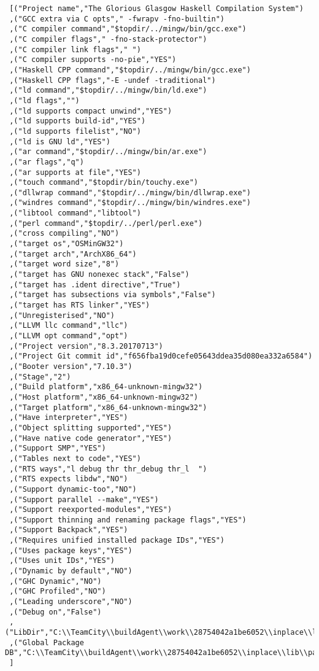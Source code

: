 \begin{verbatim}
 [("Project name","The Glorious Glasgow Haskell Compilation System")
 ,("GCC extra via C opts"," -fwrapv -fno-builtin")
 ,("C compiler command","$topdir/../mingw/bin/gcc.exe")
 ,("C compiler flags"," -fno-stack-protector")
 ,("C compiler link flags"," ")
 ,("C compiler supports -no-pie","YES")
 ,("Haskell CPP command","$topdir/../mingw/bin/gcc.exe")
 ,("Haskell CPP flags","-E -undef -traditional")
 ,("ld command","$topdir/../mingw/bin/ld.exe")
 ,("ld flags","")
 ,("ld supports compact unwind","YES")
 ,("ld supports build-id","YES")
 ,("ld supports filelist","NO")
 ,("ld is GNU ld","YES")
 ,("ar command","$topdir/../mingw/bin/ar.exe")
 ,("ar flags","q")
 ,("ar supports at file","YES")
 ,("touch command","$topdir/bin/touchy.exe")
 ,("dllwrap command","$topdir/../mingw/bin/dllwrap.exe")
 ,("windres command","$topdir/../mingw/bin/windres.exe")
 ,("libtool command","libtool")
 ,("perl command","$topdir/../perl/perl.exe")
 ,("cross compiling","NO")
 ,("target os","OSMinGW32")
 ,("target arch","ArchX86_64")
 ,("target word size","8")
 ,("target has GNU nonexec stack","False")
 ,("target has .ident directive","True")
 ,("target has subsections via symbols","False")
 ,("target has RTS linker","YES")
 ,("Unregisterised","NO")
 ,("LLVM llc command","llc")
 ,("LLVM opt command","opt")
 ,("Project version","8.3.20170713")
 ,("Project Git commit id","f656fba19d0cefe05643ddea35d080ea332a6584")
 ,("Booter version","7.10.3")
 ,("Stage","2")
 ,("Build platform","x86_64-unknown-mingw32")
 ,("Host platform","x86_64-unknown-mingw32")
 ,("Target platform","x86_64-unknown-mingw32")
 ,("Have interpreter","YES")
 ,("Object splitting supported","YES")
 ,("Have native code generator","YES")
 ,("Support SMP","YES")
 ,("Tables next to code","YES")
 ,("RTS ways","l debug thr thr_debug thr_l  ")
 ,("RTS expects libdw","NO")
 ,("Support dynamic-too","NO")
 ,("Support parallel --make","YES")
 ,("Support reexported-modules","YES")
 ,("Support thinning and renaming package flags","YES")
 ,("Support Backpack","YES")
 ,("Requires unified installed package IDs","YES")
 ,("Uses package keys","YES")
 ,("Uses unit IDs","YES")
 ,("Dynamic by default","NO")
 ,("GHC Dynamic","NO")
 ,("GHC Profiled","NO")
 ,("Leading underscore","NO")
 ,("Debug on","False")
 ,("LibDir","C:\\TeamCity\\buildAgent\\work\\28754042a1be6052\\inplace\\lib")
 ,("Global Package DB","C:\\TeamCity\\buildAgent\\work\\28754042a1be6052\\inplace\\lib\\package.conf.d")
 ]
\end{verbatim}
